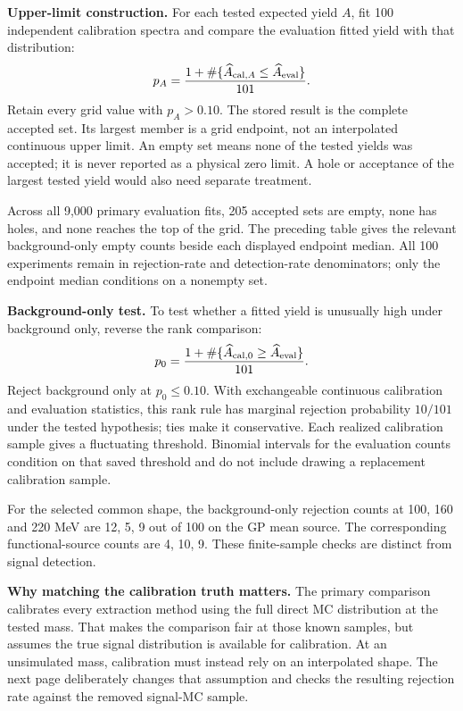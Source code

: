 \documentclass[11pt]{article}
\begin{document}
\textbf{Upper-limit construction.} For each tested expected yield $A$, fit 100 independent calibration spectra and compare the evaluation fitted yield with that distribution:
\[
 p_A=\frac{1+\#\{\widehat A_{{\rm cal},A}\le\widehat A_{\rm eval}\}}{101}.
\]
Retain every grid value with $p_A>0.10$. The stored result is the complete accepted set. Its largest member is a grid endpoint, not an interpolated continuous upper limit. An empty set means none of the tested yields was accepted; it is never reported as a physical zero limit. A hole or acceptance of the largest tested yield would also need separate treatment.

Across all 9,000 primary evaluation fits, 205 accepted sets are empty, none has holes, and none reaches the top of the grid. The preceding table gives the relevant background-only empty counts beside each displayed endpoint median. All 100 experiments remain in rejection-rate and detection-rate denominators; only the endpoint median conditions on a nonempty set.

\textbf{Background-only test.} To test whether a fitted yield is unusually high under background only, reverse the rank comparison:
\[
 p_0=\frac{1+\#\{\widehat A_{{\rm cal},0}\ge\widehat A_{\rm eval}\}}{101}.
\]
Reject background only at $p_0\le0.10$. With exchangeable continuous calibration and evaluation statistics, this rank rule has marginal rejection probability $10/101$ under the tested hypothesis; ties make it conservative. Each realized calibration sample gives a fluctuating threshold. Binomial intervals for the evaluation counts condition on that saved threshold and do not include drawing a replacement calibration sample.

For the selected common shape, the background-only rejection counts at 100, 160 and 220 MeV are 12, 5, 9 out of 100 on the GP mean source. The corresponding functional-source counts are 4, 10, 9. These finite-sample checks are distinct from signal detection.

\textbf{Why matching the calibration truth matters.} The primary comparison calibrates every extraction method using the full direct MC distribution at the tested mass. That makes the comparison fair at those known samples, but assumes the true signal distribution is available for calibration. At an unsimulated mass, calibration must instead rely on an interpolated shape. The next page deliberately changes that assumption and checks the resulting rejection rate against the removed signal-MC sample.
\end{document}
